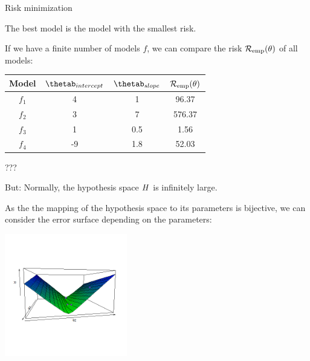 \documentclass[11pt,compress,t,notes=noshow, xcolor=table]{beamer}
\begin{document}
\begin{vbframe}{Risk minimization}

The best model is the model with the smallest risk. 

\lz

If we have a finite number of models $f$, we can compare the risk $\mathcal{R}_{\text{emp}}(\theta)$ of all models: 


\begin{center}
\begin{tabular}{ c | c | c || c }
 Model & \(\displaystyle \thetab_{intercept} \) & \(\displaystyle \thetab_{slope} \) & \(\displaystyle \mathcal{R}_{\text{emp}}(\theta) \) \\ 
 \hline
\(\displaystyle f_1 \)  &    4   & 1 & 96.37 \\
\(\displaystyle f_2 \)   &    3 &   7 & 576.37\\
\rowcolor{lightgray}
\(\displaystyle f_3 \)   &    1  &   0.5 & 1.56\\
\(\displaystyle f_4 \)   &    -9 &   1.8 & 52.03\\
\end{tabular}
\end{center}


\end{vbframe}

\begin{vbframe}{???}

But: Normally, the hypothesis space $H$ is infinitely large. 

\lz

As the the mapping of the hypothesis space to its parameters is bijective, we can consider the error surface depending on the parameters:

\begin{center}
\includegraphics[width=0.4\textwidth]{figure/ml-basic-riskmin-error-surface.png}
\end{center}

\end{vbframe}
\end{document}
